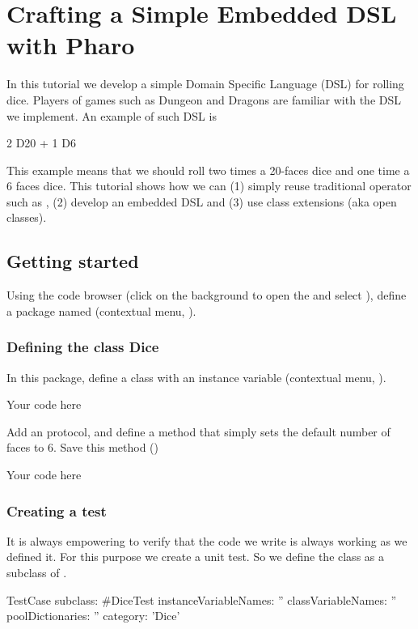 \documentclass[a4paper,10pt,twoside]{book}
\begin{document}
\fi
\sloppy

\chapter{Crafting a Simple Embedded DSL with Pharo}
In this tutorial we develop a simple Domain Specific Language (DSL) for rolling dice. Players of games such as Dungeon and Dragons are familiar with the DSL we implement. An example of such DSL is


\begin{code}{}
2 D20 + 1 D6
\end{code}


This example means that we should roll two times a 20-faces dice and one time a 6 faces dice. This tutorial shows how we can (1) simply reuse traditional operator such as \ct{+}, (2) develop an embedded DSL and (3) use class extensions (aka open classes).
\section{ Getting started}
Using the code browser (click on the background to open the  and select ), define a package named  (contextual menu, ).
\subsection{ Defining the class Dice}
In this package, define a class  with an instance variable  (contextual menu, ).


\begin{code}{}
Your code here
\end{code}


Add an  protocol, and define a method  that simply sets the default number of faces to 6. Save this method ()


\begin{code}{}
Your code here
\end{code}

\subsection{ Creating a test}
It is always empowering to verify that the code we write is always working as we defined it. For this purpose we create a unit test.
So we define the class  as a subclass of .


\begin{code}{}
TestCase subclass: #DiceTest
    instanceVariableNames: ''
    classVariableNames: ''
    poolDictionaries: ''
    category: 'Dice'
\end{code}
\end{document}
